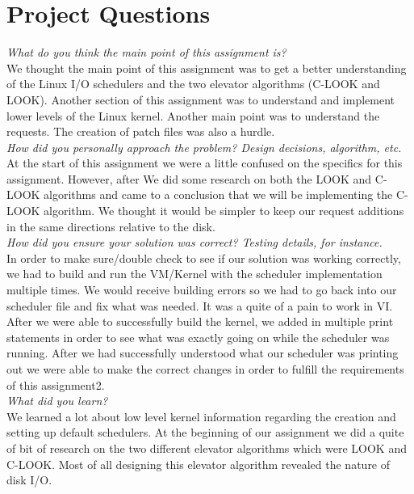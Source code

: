 \documentclass[letterpaper,10pt,titlepage]{article}
\begin{document}
\section{Project Questions}

\textit{What do you think the main point of this assignment is?}\\

We thought the main point of this assignment was to get a better understanding of the Linux I/O schedulers and the two elevator algorithms (C-LOOK and LOOK). Another section of this assignment was to understand and implement lower levels of the Linux kernel. Another main point was to understand the requests. The creation of patch files was also a hurdle.\\

\textit{How did you personally approach the problem? Design decisions, algorithm, etc.}\\

At the start of this assignment we were a little confused on the specifics for this assignment. However, after We did some research on both the LOOK and C-LOOK algorithms and came to a conclusion that we will be implementing the C-LOOK algorithm. We thought it would be simpler to keep our request additions in the same directions relative to the disk.\\

\textit{How did you ensure your solution was correct? Testing details, for instance.}\\

In order to make sure/double check to see if our solution was working correctly, we had to build and run the VM/Kernel with the scheduler implementation multiple times. We would receive building errors so we had to go back into our scheduler file and fix what was needed. It was a quite of a pain to work in VI. After we were able to successfully build the kernel, we added in multiple print statements in order to see what was exactly going on while the scheduler was running. After we had successfully understood what our scheduler was printing out we were able to make the correct changes in order to fulfill the requirements of this assignment2.\\

\textit{What did you learn?}\\

We learned a lot about low level kernel information regarding the creation and setting up default schedulers. At the beginning of our assignment we did a quite of bit of research on the two different elevator algorithms which were LOOK and C-LOOK. Most of all designing this elevator algorithm revealed the nature of disk I/O.\\
\end{document}
